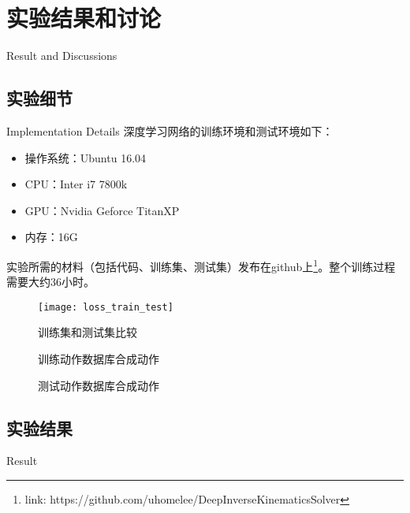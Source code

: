 \chapter{实验结果和讨论}{Result and Discussions}
\section{实验细节}{Implementation Details}
\label{sec:implementation}
深度学习网络的训练环境和测试环境如下：
\begin{itemize}
	\item{操作系统：}Ubuntu 16.04
	\item{CPU：}Inter i7 7800k
	\item{GPU：}Nvidia Geforce TitanXP
	\item{内存：}16G
\end{itemize}
实验所需的材料（包括代码、训练集、测试集）发布在github上\footnote{link: https://github.com/uhomelee/DeepInverseKinematicsSolver}。整个训练过程需要大约36小时。
\begin{figure}[!htbp]
	\centering
	\texttt{[image: loss\_train\_test]}
	\caption[]{\label{fig:train_test}
		训练集和测试集比较
	}
\end{figure}
\begin{figure}
\centering
{}
\caption{训练动作数据库合成动作}
\label{fig:train_screenshot}
\end{figure}
\begin{figure}
\centering
{}
\caption{测试动作数据库合成动作}
\label{fig:test_screenshot}
\end{figure}
\section{实验结果}{Result}
